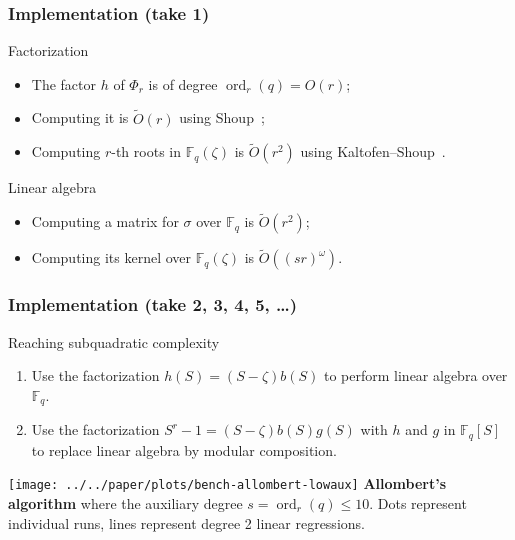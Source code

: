 \documentclass[francais]{beamer}
\def\F {\ensuremath{\mathbb{F}}}
\def\tildO {\tilde{O}}
\DeclareMathOperator{\ord}{ord}
\begin{document}
\begin{frame}\frametitle{Implementation (take 1)}
  \begin{block}{Factorization}
  \begin{itemize}
  \item The factor $h$ of $\Phi_r$ is of degree $\ord_r(q) = O(r)$;
  \item Computing it is $\tildO(r)$ using Shoup~\cite{shoup94};
  \item Computing $r$-th roots in $\F_q(\zeta)$ is $\tildO(r^2)$ using Kaltofen--Shoup~\cite{kaltofen+shoup97}.
  \end{itemize}
\end{block}
  \begin{block}{Linear algebra}
  \begin{itemize}
  \item Computing a matrix for $\sigma$ over $\F_q$ is $\tildO(r^2)$;
  \item Computing its kernel over $\F_q(\zeta)$ is \alert{$\tildO((sr)^\omega)$}.
  \end{itemize}
\end{block}
\end{frame}

\begin{frame}\frametitle{Implementation (take 2, 3, 4, 5, \ldots)}
  \begin{block}{Reaching subquadratic complexity}
    \begin{enumerate}
    \item Use the factorization $h(S) = (S - \zeta) b(S)$ to perform linear algebra over $\F_q$.
    \item Use the factorization $S^r - 1 =  (S - \zeta) b(S) g(S)$ with $h$ and $g$ in $\F_q[S]$ to replace linear algebra by modular composition.
    \end{enumerate}
\end{block}
\end{frame}

\begin{frame}
    \centering
    \texttt{[image: ../../paper/plots/bench-allombert-lowaux]}
      \flushleft
      \textbf{Allombert's algorithm} where the auxiliary degree
      $s=\ord_r(q)\le 10$.  Dots represent individual runs, lines
      represent degree 2 linear regressions.
\end{frame}
\end{document}
